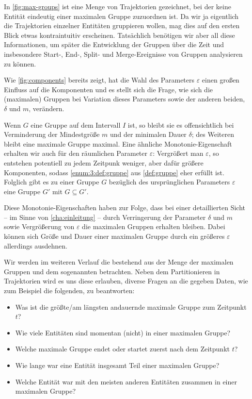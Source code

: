 In \cref{fig:max-groups} ist eine Menge von Trajektorien gezeichnet, bei der keine Entität eindeutig einer maximalen Gruppe zuzuordnen ist.
Da wir ja eigentlich die Trajektorien einzelner Entitäten gruppieren wollen, mag dies auf den ersten Blick etwas kontraintuitiv erscheinen.
Tatsächlich benötigen wir aber all diese Informationen, um später die Entwicklung der Gruppen über die Zeit und insbesondere Start-, End-, Split- und Merge-Ereignisse von Gruppen analysieren zu können.

Wie \cref{fig:components} bereits zeigt, hat die Wahl des Parameters $\varepsilon$ einen großen Einfluss auf die Komponenten und es stellt sich die Frage, wie sich die (maximalen) Gruppen bei Variation dieses Parameters sowie der anderen beiden, $\delta$ und $m$, verändern.

Wenn $G$ eine Gruppe auf dem Intervall $I$ ist, so bleibt sie es offensichtlich bei Verminderung der Mindestgröße $m$ und der minimalen Dauer $\delta$; des Weiteren bleibt eine maximale Gruppe maximal.
Eine ähnliche Monotonie-Eigenschaft erhalten wir auch für den räumlichen Parameter $\varepsilon$:
Vergrößert man $\varepsilon$, so entstehen potentiell zu jedem Zeitpunk weniger, aber dafür größere Komponenten, sodass \cref{enum:3:def:gruppe} aus \cref{def:gruppe} eher erfüllt ist.
Folglich gibt es zu einer Gruppe $G$ bezüglich des ursprünglichen Parameters $\varepsilon$ eine Gruppe $G'$ mit $G \subseteq G'$.

Diese Monotonie-Eigenschaften haben zur Folge, dass bei einer detaillierten Sicht -- im Sinne von \cref{cha:einleitung} -- durch Verringerung der Parameter $\delta$ und $m$ sowie Vergrößerung von $\varepsilon$ die maximalen Gruppen erhalten bleiben.
Dabei können sich Größe und Dauer einer maximalen Gruppe durch ein größeres $\varepsilon$ allerdings ausdehnen.

Wir werden im weiteren Verlauf die \bet{\GrpStruktur} bestehend aus der Menge der maximalen Gruppen und dem sogenannten  betrachten.
Neben dem Partitionieren in Trajektorien wird es uns diese \GrpStruktur erlauben, diverse Fragen an die gegeben Daten, wie zum Beispiel die folgenden, zu beantworten:
\begin{itemize}
	\item Was ist die größte/am längsten andauernde maximale Gruppe zum Zeitpunkt $t$?
	\item Wie viele Entitäten sind momentan (nicht) in einer maximalen Gruppe?
	\item Welche maximale Gruppe endet oder startet zuerst nach dem Zeitpunkt $t$?
	\item Wie lange war eine Entität insgesamt Teil einer maximalen Gruppe?
	\item Welche Entität war mit den meisten anderen Entitäten zusammen in einer maximalen Gruppe?
\end{itemize}


